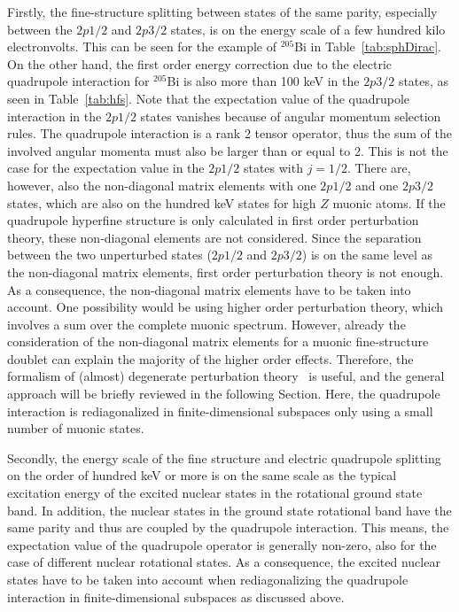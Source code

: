 Firstly, the fine-structure splitting between states of the same parity, especially between the $2p1/2$ and $2p3/2$ states, is on the energy scale of a few hundred kilo electronvolts. This can be seen for the example of $^{205}$Bi in Table~\ref{tab:sphDirac}. On the other hand, the first order energy correction due to the electric quadrupole interaction for $^{205}$Bi is also more than 100 keV in the $2p3/2$ states, as seen in Table~\ref{tab:hfs}. Note that the expectation value of the quadrupole interaction in the $2p1/2$ states vanishes because of angular momentum selection rules. The quadrupole interaction is a rank 2 tensor operator, thus the sum of the involved angular momenta must also be larger than or equal to 2. This is not the case for the expectation value in the $2p1/2$ states with $j=1/2$. There are, however, also the non-diagonal matrix elements with one $2p1/2$ and one $2p3/2$ states, which are also on the hundred keV states for high $Z$ muonic atoms. If the quadrupole hyperfine structure is only calculated in first order perturbation theory, these non-diagonal elements are not considered. Since the separation between the two unperturbed states ($2p1/2$ and $2p3/2$) is on the same level as the non-diagonal matrix elements, first order perturbation theory is not enough. As a consequence, the non-diagonal matrix elements have to be taken into account. One possibility would be using higher order perturbation theory, which involves a sum over the complete muonic spectrum. However, already the consideration of the non-diagonal matrix elements for a muonic fine-structure doublet can explain the majority of the higher order effects. Therefore, the formalism of (almost) degenerate perturbation theory~\cite{sakurai1994} is useful, and the general approach will be briefly reviewed in the following Section. Here, the quadrupole interaction is rediagonalized in finite-dimensional subspaces only using a small number of muonic states. 

Secondly, the energy scale of the fine structure and electric quadrupole splitting on the order of hundred keV or more is on the same scale as the typical excitation energy of the excited nuclear states in the rotational ground state band. In addition, the nuclear states in the ground state rotational band have the same parity and thus are coupled by the quadrupole interaction. This means, the expectation value of the quadrupole operator is generally non-zero, also for the case of different nuclear rotational states. As a consequence, the excited nuclear states have to be taken into account when rediagonalizing the quadrupole interaction in finite-dimensional subspaces as discussed above.

